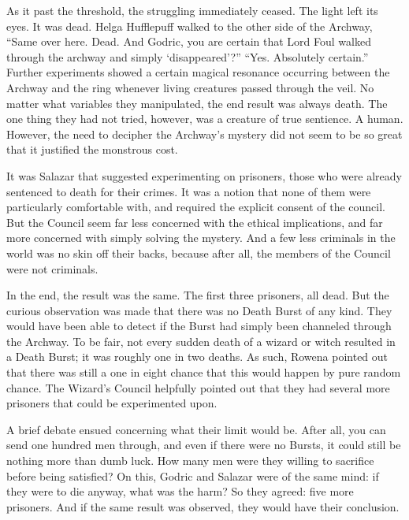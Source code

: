 \SmallVSpace
As it past the threshold, the struggling immediately ceased. The light left its eyes. It was dead.
\SmallVSpace
Helga Hufflepuff walked to the other side of the Archway, “Same over here. Dead. And Godric, you are certain that Lord Foul walked through the archway and simply ‘disappeared’?”
\SmallVSpace
“Yes. Absolutely certain.”
\SmallVSpace
Further experiments showed a certain magical resonance occurring between the Archway and the ring whenever living creatures passed through the veil. No matter what variables they manipulated, the end result was always death. The one thing they had not tried, however, was a creature of true sentience. A human. However, the need to decipher the Archway’s mystery did not seem to be so great that it justified the monstrous cost.

It was Salazar that suggested experimenting on prisoners, those who were already sentenced to death for their crimes. It was a notion that none of them were particularly comfortable with, and required the explicit consent of the council. But the Council seem far less concerned with the ethical implications, and far more concerned with simply solving the mystery. And a few less criminals in the world was no skin off their backs, because after all, the members of the Council were not criminals.

In the end, the result was the same. The first three prisoners, all dead. But the  curious observation was made that there was no Death Burst of any kind. They would have been able to detect if the Burst had simply been channeled through the Archway. To be fair, not every sudden death of a wizard or witch resulted in a Death Burst; it was roughly one in two deaths. As such, Rowena pointed out that there was still a one in eight chance that this would happen by pure random chance. The Wizard’s Council helpfully pointed out that they had several more prisoners that could be experimented upon.

A brief debate ensued concerning what their limit would be. After all, you can send one hundred men through, and even if there were no Bursts, it could still be nothing more than dumb luck. How many men were they willing to sacrifice before being satisfied? On this, Godric and Salazar were of the same mind: if they were to die anyway, what was the harm? So they agreed: five more prisoners. And if the same result was observed, they would have their conclusion.

